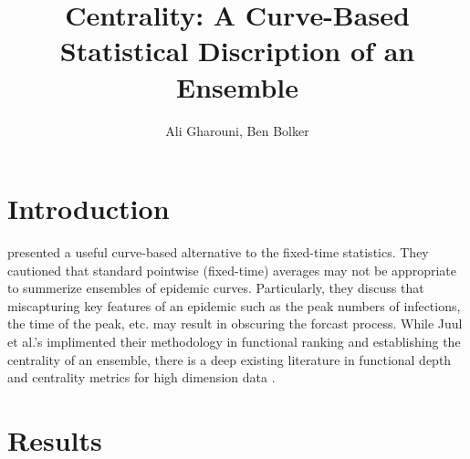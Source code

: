 \documentclass[12pt]{article}
\title{Centrality: A Curve-Based Statistical Discription of an Ensemble}
\author{Ali Gharouni, Ben Bolker}
\theoremstyle{definition} %
\begin{document}
\maketitle
\linenumbers

\section{Introduction}

\cite{juul2021fixed} presented a useful curve-based alternative to the fixed-time statistics. 
They cautioned that standard pointwise (fixed-time) averages may not be appropriate to summerize ensembles of epidemic curves. Particularly, they discuss that miscapturing key features of an epidemic such as the peak numbers of infections, the time of the peak, etc. may result in obscuring the forcast process.
While Juul et al.'s implimented their methodology in functional ranking and establishing the centrality of an ensemble, there is a deep existing literature in functional depth and centrality metrics for high dimension data \citep{lopez2009concept, sun2012exact}. 



\section{Results}
\end{document}
